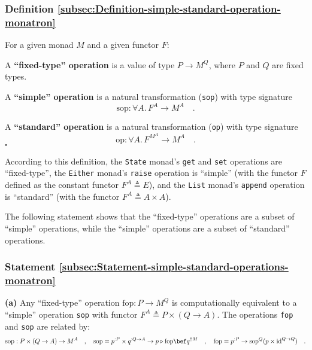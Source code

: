 \subsubsection{Definition \label{subsec:Definition-simple-standard-operation-monatron}\ref{subsec:Definition-simple-standard-operation-monatron}}

For a given monad $M$ and a given functor $F$:

A \textbf{\textsf{``}fixed-type\textsf{''} operation} is a value of type $P\rightarrow M^{Q}$,
where $P$ and $Q$ are fixed types.

A \textbf{\textsf{``}simple\textsf{''} operation} is a natural transformation (\lstinline!sop!)
with type signature
\[
\text{sop}:\forall A.\,F^{A}\rightarrow M^{A}\quad.
\]

A \textbf{\textsf{``}standard\textsf{''} operation} is a natural transformation (\lstinline!op!)
with type signature
\[
\text{op}:\forall A.\,F^{M^{A}}\rightarrow M^{A}\quad.
\]
$\square$

According to this definition, the \lstinline!State! monad\textsf{'}s \lstinline!get!
and \lstinline!set! operations are \textsf{``}fixed-type\textsf{''}, the \lstinline!Either!
monad\textsf{'}s \lstinline!raise! operation is \textsf{``}simple\textsf{''} (with the functor
$F$ defined as the constant functor $F^{A}\triangleq E$), and the
\lstinline!List! monad\textsf{'}s \lstinline!append! operation is \textsf{``}standard\textsf{''}
(with the functor $F^{A}\triangleq A\times A$). 

The following statement shows that the \textsf{``}fixed-type\textsf{''} operations
are a subset of \textsf{``}simple\textsf{''} operations, while the \textsf{``}simple\textsf{''} operations
are a subset of \textsf{``}standard\textsf{''} operations.

\subsubsection{Statement \label{subsec:Statement-simple-standard-operations-monatron}\ref{subsec:Statement-simple-standard-operations-monatron}}

\textbf{(a)} Any \textsf{``}fixed-type\textsf{''} operation $\text{fop}:P\rightarrow M^{Q}$
is computationally equivalent to a \textsf{``}simple\textsf{''} operation \lstinline!sop!
with functor $F^{A}\triangleq P\times\left(Q\rightarrow A\right)$.
The operations \lstinline!fop! and \lstinline!sop! are related by:
\[
\text{sop}:P\times\left(Q\rightarrow A\right)\rightarrow M^{A}\quad,\quad\text{sop}=p^{:P}\times q^{:Q\rightarrow A}\rightarrow p\triangleright\text{fop}\bef q^{\uparrow M}\quad,\quad\text{fop}=p^{:P}\rightarrow\text{sop}^{Q}(p\times\text{id}^{Q\rightarrow Q})\quad.
\]

